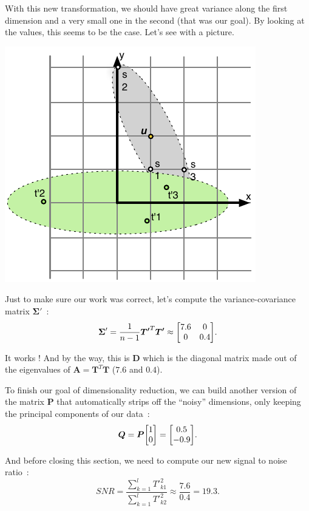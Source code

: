 \documentclass[11pt,twocolumn]{amsart} %
\newcommand{\ma}[1]{\boldsymbol{#1}}
\newenvironment{m}{\begin{bmatrix}}{\end{bmatrix}}
\begin{document}
With this new transformation, we should have great variance along the first dimension and a very small one in the second (that was our goal). By looking at the values, this seems to be the case. Let's see with a picture.

\includegraphics{points2.pdf}

Just to make sure our work was correct, let's compute the variance-covariance matrix $\ma\Sigma'$~:
\[
  \ma\Sigma' = \frac{1}{n-1}\ma{T'}^T\ma{T'} \approx \begin{m} 7.6 & 0 \\ 0 & 0.4 \end{m}.
\]

It works ! And by the way, this is $\ma{D}$ which is the diagonal matrix made out of the eigenvalues of $\ma{A} = \ma{T}^T\ma{T}$ ($7.6$ and $0.4$).

To finish our goal of dimensionality reduction, we can build another version of the matrix $\ma{P}$ that automatically strips off the ``noisy'' dimensions, only keeping the principal components of our data~:
\[
  \ma{Q} = \ma{P}\begin{m} 1 \\ 0 \end{m} = \begin{m}0.5 \\ -0.9\end{m}.
\]

And before closing this section, we need to compute our new signal to noise ratio~:
\[
  SNR = \frac{\sum_{k=1}^l {T'}_{k1}^2}{\sum_{k=1}^l {T'}_{k2}^2} \approx \frac{7.6}{0.4} = 19.3.
\]
\end{document}
